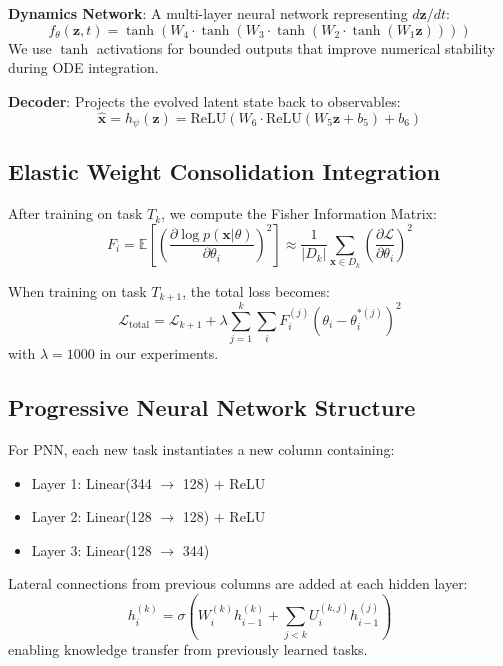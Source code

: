 \documentclass[journal,12pt,onecolumn]{IEEEtran}
\begin{document}
\textbf{Dynamics Network}: A multi-layer neural network representing $d\mathbf{z}/dt$:
\begin{equation}
f_\theta(\mathbf{z}, t) = \tanh(W_4 \cdot \tanh(W_3 \cdot \tanh(W_2 \cdot \tanh(W_1 \mathbf{z}))))
\end{equation}
We use $\tanh$ activations for bounded outputs that improve numerical stability during ODE integration.

\textbf{Decoder}: Projects the evolved latent state back to observables:
\begin{equation}
\hat{\mathbf{x}} = h_{\psi}(\mathbf{z}) = \text{ReLU}(W_6 \cdot \text{ReLU}(W_5 \mathbf{z} + b_5) + b_6)
\end{equation}

\subsection{Elastic Weight Consolidation Integration}

After training on task $T_k$, we compute the Fisher Information Matrix:
\begin{equation}
F_i = \mathbb{E}\left[ \left( \frac{\partial \log p(\mathbf{x}|\theta)}{\partial \theta_i} \right)^2 \right] \approx \frac{1}{|D_k|} \sum_{\mathbf{x} \in D_k} \left( \frac{\partial \mathcal{L}}{\partial \theta_i} \right)^2
\label{eq:fisher}
\end{equation}

When training on task $T_{k+1}$, the total loss becomes:
\begin{equation}
\mathcal{L}_{\text{total}} = \mathcal{L}_{k+1} + \lambda \sum_{j=1}^{k} \sum_i F^{(j)}_i (\theta_i - \theta^{*(j)}_i)^2
\end{equation}
with $\lambda = 1000$ in our experiments.

\subsection{Progressive Neural Network Structure}

For PNN, each new task instantiates a new column containing:
\begin{itemize}
    \item Layer 1: Linear(344 $\to$ 128) + ReLU
    \item Layer 2: Linear(128 $\to$ 128) + ReLU
    \item Layer 3: Linear(128 $\to$ 344)
\end{itemize}

Lateral connections from previous columns are added at each hidden layer:
\begin{equation}
h_i^{(k)} = \sigma\left(W_i^{(k)} h_{i-1}^{(k)} + \sum_{j<k} U_i^{(k,j)} h_{i-1}^{(j)}\right)
\end{equation}
enabling knowledge transfer from previously learned tasks.
\end{document}
